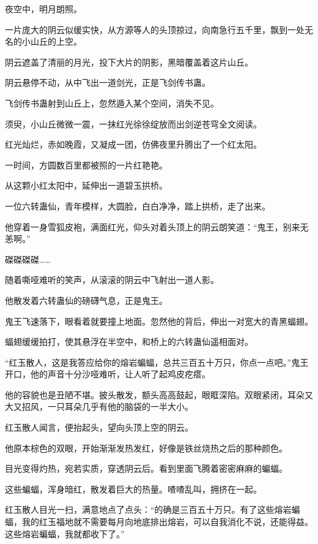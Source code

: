 
\begin{this_body}

夜空中，明月朗照。

一片庞大的阴云似缓实快，从方源等人的头顶掠过，向南急行五千里，飘到一处无名的小山丘的上空。

阴云遮盖了清丽的月光，投下大片的阴影，黑暗覆盖着这片山丘。

阴云悬停不动，从中飞出一道剑光，正是飞剑传书蛊。

飞剑传书蛊射到山丘上，忽然遁入某个空间，消失不见。

须臾，小山丘微微一震，一抹红光徐徐绽放而出剑逆苍穹全文阅读。

红光灿烂，赤如晚霞，又凝成一团，仿佛夜里升腾出了一个红太阳。

一时间，方圆数百里都被照的一片红艳艳。

从这颗小红太阳中，延伸出一道碧玉拱桥。

一位六转蛊仙，青年模样，大圆脸，白白净净，踏上拱桥，走了出来。

他穿着一身雪狐皮袍，满面红光，仰头对着头顶上的阴云朗笑道：“鬼王，别来无恙啊。”

磔磔磔磔……

随着嘶哑难听的笑声，从滚滚的阴云中飞射出一道人影。

他散发着六转蛊仙的磅礴气息，正是鬼王。

鬼王飞速落下，眼看着就要撞上地面。忽然他的背后，伸出一对宽大的青黑蝠翅。

蝠翅缓缓拍打，使其悬浮在半空中，和桥上的六转蛊仙遥相面对。

“红玉散人，这是我答应给你的熔岩蝙蝠，总共三百五十万只，你点一点吧。”鬼王开口，他的声音十分沙哑难听，让人听了起鸡皮疙瘩。

他的容貌也是丑陋不堪。披头散发，额头高高鼓起，眼眶深陷。双眼紧闭，耳朵又大又招风，一只耳朵几乎有他的脑袋的一半大小。

红玉散人闻言，便抬起头，望向头顶上空的阴云。

他原本棕色的双眼，开始渐渐发热发红，好像是铁丝烧热之后的那种颜色。

目光变得灼热，宛若实质，穿透阴云后。看到里面飞腾着密密麻麻的蝙蝠。

这些蝙蝠，浑身暗红，散发着巨大的热量。喳喳乱叫，拥挤在一起。

红玉散人目光一扫，满意地点了点头：“的确是三百五十万只。有了这些熔岩蝙蝠，我的红玉福地就不需要每月向地底排出熔岩，可以自我消化不说，还能得益。这些熔岩蝙蝠，我就都收下了。”


\end{this_body}
